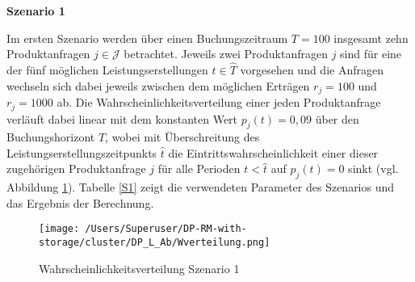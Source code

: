 \textbf{Szenario 1}

Im ersten Szenario werden über einen Buchungszeitraum $T=100$ insgesamt zehn Produktanfragen $j\in\mathcal{J}$ betrachtet. Jeweils zwei Produktanfragen $j$ sind für eine der fünf möglichen Leistungserstellungen $\hat t\in\hat T$ vorgesehen und die Anfragen wechseln sich dabei jeweils zwischen dem möglichen Erträgen $r_j=100$ und $r_j=1000$ ab. Die Wahrscheinlichkeitsverteilung einer jeden Produktanfrage verläuft dabei linear mit dem konstanten Wert $p_j(t)=0,09$ über den Buchungshorizont $T$, wobei mit Überschreitung des Leistungserstellungszeitpunkts $\hat t$ die Eintrittswahrscheinlichkeit einer dieser zugehörigen Produktanfrage $j$ für alle Perioden $t<\hat t$ auf $p_j(t)=0$ sinkt (vgl. Abbildung \ref{SB1}). Tabelle \ref{S1} zeigt die verwendeten Parameter des Szenarios und das Ergebnis der Berechnung.

\begin{figure}[h!]
  \begin{center}
    \texttt{[image: /Users/Superuser/DP-RM-with-storage/cluster/DP\_L\_Ab/Wverteilung.png]}
    \caption{Wahrscheinlichkeitsverteilung Szenario 1}  \label{SB1}
  \end{center}
\end{figure}

